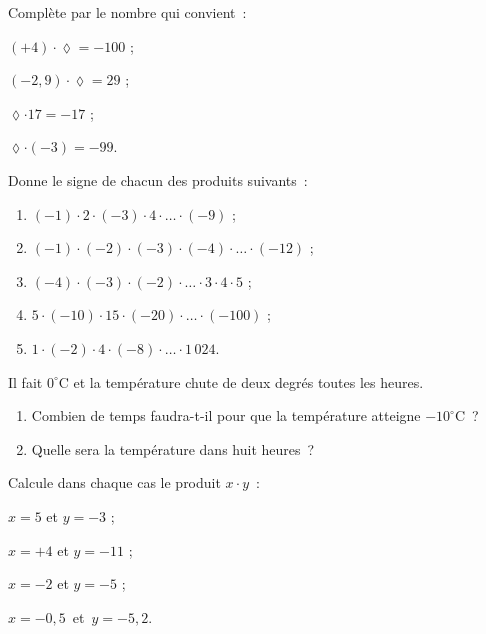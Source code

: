 \begin{exercice}
Complète par le nombre qui convient :
\begin{colenumerate}{2}
 \item $(+4) \cdot \lozenge = -100$ ;
 \item $(-2,9) \cdot \lozenge = 29$ ;  
 \item $\lozenge \cdot 17 = -17$ ;
 \item $\lozenge \cdot (-3) = -99$.
 \end{colenumerate}
\end{exercice}


\begin{exercice}
Donne le signe de chacun des produits suivants :
\begin{enumerate}
 \item $(-1) \cdot 2 \cdot (-3) \cdot 4 \cdot \ldots \cdot (-9)$ ;
 \item $(-1) \cdot (-2) \cdot (-3) \cdot (-4) \cdot \ldots \cdot (-12)$ ;
 \item $(-4) \cdot (-3) \cdot (-2) \cdot \ldots \cdot 3 \cdot 4 \cdot 5$ ;
 \item $5 \cdot (-10) \cdot 15 \cdot (-20) \cdot \ldots \cdot (-100)$ ;
 \item $1 \cdot (-2) \cdot 4 \cdot (-8) \cdot \ldots \cdot 1\,024$.
 \end{enumerate}
\end{exercice}


\begin{exercice}[Températures]
Il fait $0^\circ$C et la température chute de deux degrés toutes les heures. 
\begin{enumerate}
 \item Combien de temps faudra-t-il pour que la température atteigne $-10^\circ$C ?
 \item Quelle sera la température dans huit heures ?
 \end{enumerate}
\end{exercice}


\begin{exercice}
Calcule dans chaque cas le produit $x \cdot y$ :
\begin{colenumerate}{2}
 \item $x = 5$ et $y = -3$ ;
 \item $x = +4$ et $y = -11$ ;
 \item $x = -2$ et $y = -5$ ;
 \item $x = -0,5$ et $y = -5,2$.
 \end{colenumerate}
\end{exercice}


